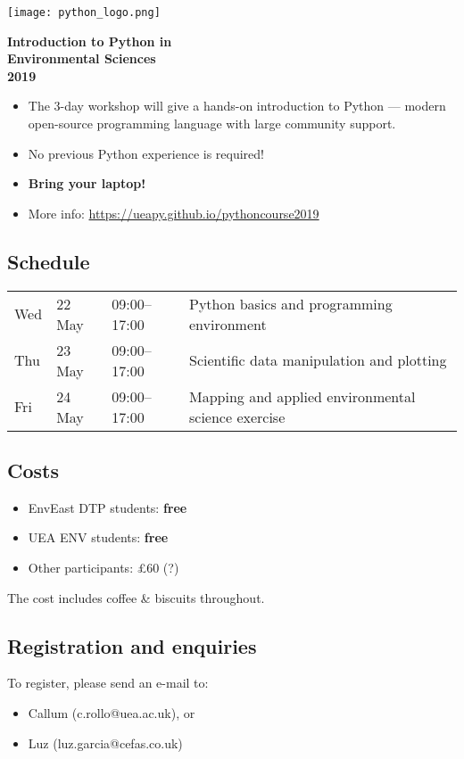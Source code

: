\documentclass[paper=a4]{scrartcl}
\newcommand*{\pyitem}{\item [{\texttt{[image: python\_logo.png]}}]}
\begin{document}
\pagestyle{empty} %

\begin{center}
\begin{minipage}{0.2\linewidth}
    \texttt{[image: python\_logo.png]}
    \vspace{0.5cm}
\end{minipage}

\Huge \textbf{Introduction to Python in \\ Environmental Sciences \\ 2019}

\end{center}

\begin{itemize}
\pyitem The 3-day workshop will give a hands-on introduction to Python --- modern open-source programming language with large community support.
\pyitem No previous Python experience is required!
\pyitem \textbf{Bring your laptop!}
\pyitem More info: \url{https://ueapy.github.io/pythoncourse2019}
\end{itemize}


\subsection*{Schedule}
\begin{center}
\begin{tabular}{llll}
Wed & 22 May & 09:00--17:00 & Python basics and programming environment\\
Thu & 23 May & 09:00--17:00 & Scientific data manipulation and plotting \\
Fri & 24 May & 09:00--17:00 & Mapping and applied environmental science exercise\\
\end{tabular}
\end{center}


\subsection*{Costs}
\begin{itemize}
\pyitem EnvEast DTP students: \textbf{free}
\pyitem UEA ENV students: \textbf{free}
\pyitem Other participants: \pounds 60 (?)
\end{itemize}
\vspace{-0.5cm}
\scriptsize The cost includes coffee \& biscuits throughout. \normalsize

\subsection*{Registration and enquiries}
To register, please send an e-mail to:
\begin{itemize}
\pyitem Callum (c.rollo@uea.ac.uk), or
\pyitem Luz (luz.garcia@cefas.co.uk)
\end{itemize}
\end{document}
